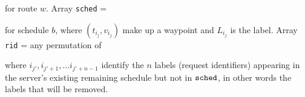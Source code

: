 \documentclass{article}
\theoremstyle{definition}                   %
\begin{document}
\noindent for route $w$. Array {\tt{}sched} =

\noindent
{}

\noindent for schedule $b$, where $(t_{i_j},v_{i_j})$ make up a waypoint and
$L_{i_j}$ is the label. Array {\tt{}rid} = any permutation of

\noindent
{}

\noindent where $i_{j'},i_{j'+1},...i_{j'+n-1}$ identify the $n$ labels
(request identifiers) appearing in the server's existing remaining
schedule but not in ${\tt{}sched}$, in other words the labels that will be removed.
\end{document}
